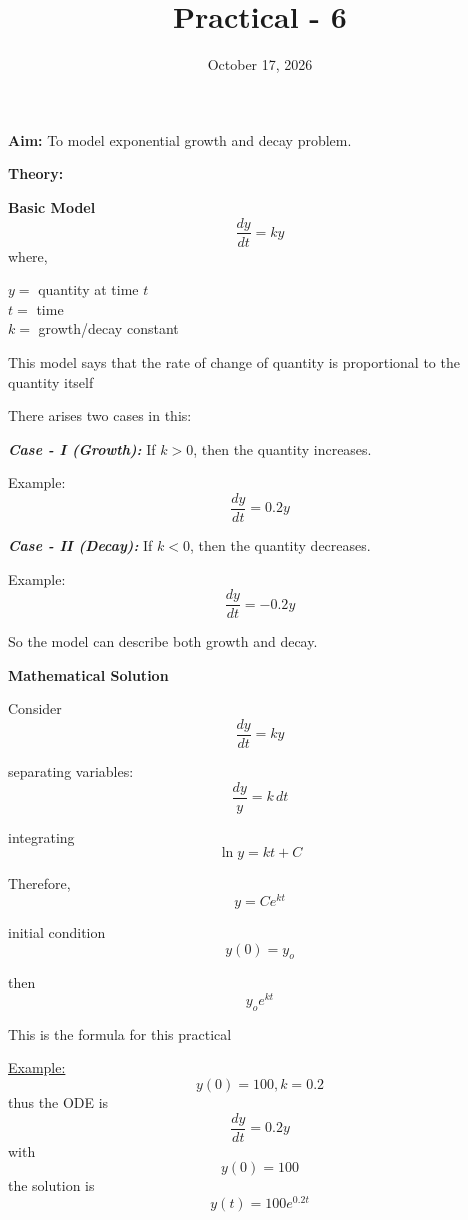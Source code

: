 \documentclass{article}
\title{\textbf{Practical - 6}}
\author{}
\date{October 17, 2026}
\begin{document}
\maketitle

\noindent
\textbf{\large{Aim:}} To model exponential growth and decay problem.

\vspace{1em}
\noindent
\textbf{\large{Theory:}}

\vspace{0.5em}
\noindent
\textbf{Basic Model}
\[\frac{dy}{dt} = ky\]
where, 
\begin{flushleft}
    $y =$ quantity at time $t$ \\
    $t =$ time \\
    $k =$ growth/decay constant
\end{flushleft}

\vspace{1.5em}
\noindent
This model says that the rate of change of quantity is proportional to the quantity itself

\noindent
There arises two cases in this:

\noindent
\textit{\textbf{Case - I (Growth):}} If $k>0$, then the quantity increases.

\vspace{0.5em}
Example: \[\frac{dy}{dt} = 0.2y\]

\noindent
\textit{\textbf{Case - II (Decay):}} If $k<0$, then the quantity decreases.

\vspace{0.5em}
Example: \[\frac{dy}{dt} = -0.2y\]

\vspace{0.5em}
\noindent
So the model can describe both growth and decay.

\vspace{1.5em}
\noindent
\textbf{Mathematical Solution}

\noindent
Consider \[\frac{dy}{dt} = ky\]

\noindent
separating variables: \[\frac{dy}{y} = k\,dt\]

\noindent
integrating \[\ln{y} = kt + C\]

\noindent
Therefore, \[y = Ce^{kt}\]

\noindent
initial condition \[y(0) = y_o\]

\noindent
then \[y_oe^{kt}\]

\noindent
This is the formula for this practical

\noindent
\underline{Example:}
\[y(0) = 100, k = 0.2\]
thus the ODE is \[\frac{dy}{dt} = 0.2y\]
with \[y(0) = 100\]
the solution is \[y(t) = 100e^{0.2t}\]
\end{document}
